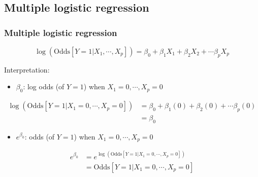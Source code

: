 \documentclass[10pt,t]{beamer}
\begin{document}
\subsection{Multiple logistic regression}
\begin{frame}
	\frametitle{Multiple logistic regression}
	\vspace{-1.5cm}
	$$\log\left(\text{Odds}[Y =1 |X_1,\cdots,X_p]\right) = \beta_0 + \beta_1 X_1 + \beta_2X_2 + \cdots \beta_p X_p$$
	
	\color{blue} Interpretation: \color{black}
	\begin{itemize}  \color{red}
		\item $\beta_0$: \pause log odds (of $Y=1$) when $X_1 = 0, \cdots, X_p = 0$ \pause
	\end{itemize}
	\vspace{-0.3cm}
	\begin{footnotesize}
		\begin{align*}
			\log\left(\text{Odds}[Y =1 |X_1=0,\cdots,X_p=0]\right) & = \beta_0 + \beta_1 (0) + \beta_2(0) + \cdots \beta_p (0) \\
			& = \beta_0 
		\end{align*} \pause
	\end{footnotesize}
	
	\vspace{-0.6cm}
	\begin{itemize}   \color{red}
		\item $e^{\beta_0}$: \pause odds (of $Y=1$) when $X_1 = 0, \cdots, X_p = 0$ \pause
	\end{itemize}
	\vspace{-0.3cm}
	\begin{footnotesize}
		\begin{align*}
			e^{\beta_0} & = e^{\log\left(\text{Odds}[Y =1 |X_1=0,\cdots,X_p=0]\right)} \\
			& = \text{Odds}[Y =1 |X_1=0,\cdots,X_p=0]
		\end{align*}
	\end{footnotesize}
\end{frame}
\end{document}
